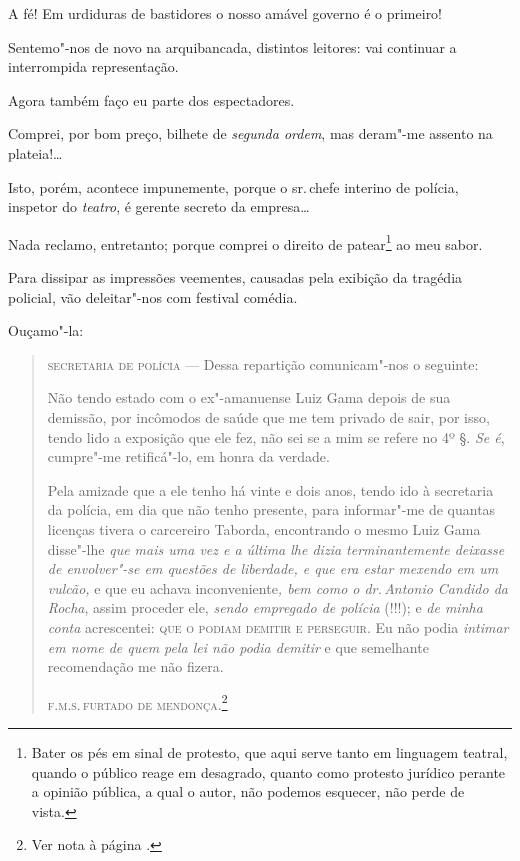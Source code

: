 A fé! Em urdiduras de bastidores o nosso amável governo é o primeiro!

Sentemo"-nos de novo na arquibancada, distintos leitores: vai continuar a
interrompida representação.

Agora também faço eu parte dos espectadores.

Comprei, por bom preço, bilhete de \emph{segunda ordem}, mas deram"-me
assento na plateia!\ldots{}

Isto, porém, acontece impunemente, porque o sr.\,chefe interino de
polícia, inspetor do \emph{teatro}, é gerente secreto da empresa\ldots{}

Nada reclamo, entretanto; porque comprei o direito de patear\footnote{
  Bater os pés em sinal de protesto, que aqui serve tanto em linguagem
  teatral, quando o público reage em desagrado, quanto como protesto
  jurídico perante a opinião pública, a qual o autor, não podemos
  esquecer, não perde de vista.} ao meu sabor.

Para dissipar as impressões veementes, causadas pela exibição da
tragédia policial, vão deleitar"-nos com festival comédia.

Ouçamo"-la:

\begin{quote}
\textsc{secretaria de polícia} --- Dessa repartição comunicam"-nos o seguinte:

Não tendo estado com o ex"-amanuense Luiz Gama depois de sua demissão,
por incômodos de saúde que me tem privado de sair, por isso, tendo lido
a exposição que ele fez, não sei se a mim se refere no 4º §. \emph{Se
é}, cumpre"-me retificá"-lo, em honra da verdade.

Pela amizade que a ele tenho há vinte e dois anos, tendo ido à
secretaria da polícia, em dia que não tenho presente, para informar"-me
de quantas licenças tivera o carcereiro Taborda, encontrando o mesmo
Luiz Gama disse"-lhe \emph{que mais uma vez e a última lhe dizia
terminantemente deixasse de envolver"-se em questões de liberdade, e que
era estar mexendo em um vulcão,} e que eu achava inconveniente\emph{,
bem como o dr.\,Antonio Candido da Rocha}, assim proceder ele,
\emph{sendo empregado de polícia} (!!!); e \emph{de minha conta}
acrescentei: \textsc{que o podiam demitir e perseguir}. Eu não podia
\emph{intimar em nome de quem pela lei não podia demitir} e que
semelhante recomendação me não fizera.

\noindent\textsc{f.m.s.\,furtado de mendonça}.\footnote{Ver nota à página \pageref{fmfm}.}
\end{quote}

